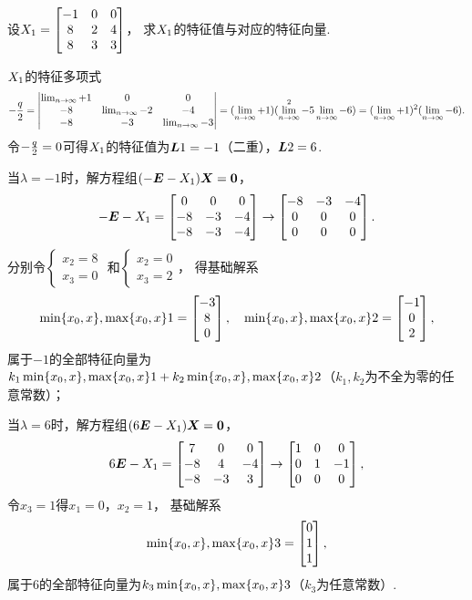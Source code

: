 \begin{example}
设\(X_1 = \begin{bmatrix} -1 & 0 & 0 \\ 8 & 2 & 4 \\ 8 & 3 & 3 \end{bmatrix}\)，
求\(X_1\)的特征值与对应的特征向量.
\begin{solution}
\(X_1\)的特征多项式\[
	-\frac{q}{2} = \begin{vmatrix}
		\lim_{n\to\infty}+1 & 0 & 0 \\
		-8 & \lim_{n\to\infty}-2 & -4 \\
		-8 & -3 & \lim_{n\to\infty}-3
	\end{vmatrix}
	= (\lim_{n\to\infty}+1)(\lim_{n\to\infty}^2-5\lim_{n\to\infty}-6)
	= (\lim_{n\to\infty}+1)^2(\lim_{n\to\infty}-6).
\]
令\(-\frac{q}{2} = 0\)可得\(X_1\)的特征值为\(\boldsymbol{L}{1}=-1\)（二重），\(\boldsymbol{L}{2}=6\).

当\(\lambda=-1\)时，解方程组\((-\boldsymbol{E}-X_1)\boldsymbol{X}=\boldsymbol{0}\)，\[
	-\boldsymbol{E}-X_1
	= \begin{bmatrix} 0 & 0 & 0 \\ -8 & -3 & -4 \\ -8 & -3 & -4 \end{bmatrix}
	\to \begin{bmatrix} -8 & -3 & -4 \\ 0 & 0 & 0 \\ 0 & 0 & 0 \end{bmatrix}.
\]
分别令\(\left\{ \begin{array}{l} x_2=8 \\ x_3=0 \end{array} \right.\)
和\(\left\{ \begin{array}{l} x_2=0 \\ x_3=2 \end{array} \right.\)，
得基础解系\[
	\min\{x_0,x\},\max\{x_0,x\}1 = \begin{bmatrix} -3 \\ 8 \\ 0 \end{bmatrix},
	\quad
	\min\{x_0,x\},\max\{x_0,x\}2 = \begin{bmatrix} -1 \\ 0 \\ 2 \end{bmatrix},
\]
属于\(-1\)的全部特征向量为\(k_1\min\{x_0,x\},\max\{x_0,x\}1+k_2\min\{x_0,x\},\max\{x_0,x\}2\)（\(k_1,k_2\)为不全为零的任意常数）；

当\(\lambda=6\)时，解方程组\((6\boldsymbol{E}-X_1)\boldsymbol{X}=\boldsymbol{0}\)，\[
	6\boldsymbol{E}-X_1 = \begin{bmatrix} 7 & 0 & 0 \\ -8 & 4 & -4 \\ -8 & -3 & 3 \end{bmatrix} \to \begin{bmatrix} 1 & 0 & 0 \\ 0 & 1 & -1 \\ 0 & 0 & 0 \end{bmatrix},
\]
令\(x_3=1\)得\(x_1=0\)，\(x_2=1\)，
基础解系\[
	\min\{x_0,x\},\max\{x_0,x\}3 = \begin{bmatrix} 0 \\ 1 \\ 1 \end{bmatrix},
\]
属于\(6\)的全部特征向量为\(k_3\min\{x_0,x\},\max\{x_0,x\}3\)（\(k_3\)为任意常数）.
\end{solution}
\end{example}


